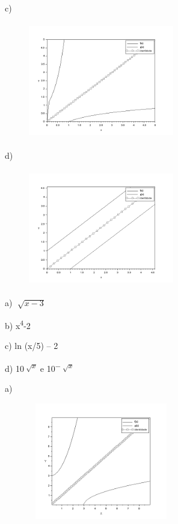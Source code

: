 \begin{respostas}{6}
\begin{multicols}{2}
    c)\begin{figure}[H]
        \begin{Center}
        \includegraphics[width=2.5in,height=2in]{capitulos/logaritmos_e_funcao_logaritmica/media/image15.png}
        \end{Center}
    \end{figure}

    d)\begin{figure}[H]
        \begin{Center}
        \includegraphics[width=2.5in,height=2in]{capitulos/logaritmos_e_funcao_logaritmica/media/image16.png}
        \end{Center}
    \end{figure}

    \ansitem{}
    a)  \( \sqrt[]{x-3} \)
    
    b) x\textsuperscript{4}-2
    
    c) ln (x/5) – 2
    
    d) 10\textsuperscript{\(\sqrt[]{x} \)} e 10\textsuperscript{\(- \sqrt[]{x} \)}

    \ansitem{}

    a)\begin{figure}[H]
        \begin{Center}
        \includegraphics[width=2.5in,height=2in]{capitulos/logaritmos_e_funcao_logaritmica/media/image17.png}
        \end{Center}
    \end{figure}


\end{multicols}
\end{respostas}
